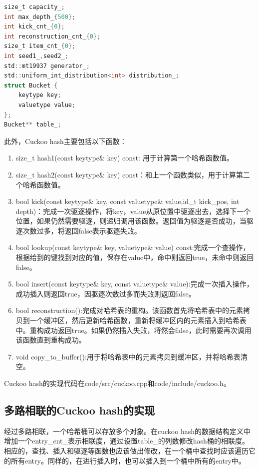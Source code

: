 \documentclass[supercite]{Experimental_Report}
\theoremstyle{definition}
\begin{document}
\begin{lstlisting}[float=h,language=C,caption={Cuckoo hash的数据结构的定义},label={lst:data_structure}]
size_t capacity_;
int max_depth_{500};
int kick_cnt_{0};
int reconstruction_cnt_{0};
size_t item_cnt_{0};
int seed1_,seed2_;
std::mt19937 generator_;
std::uniform_int_distribution<int> distribution_;
struct Bucket {
    keytype key;
    valuetype value;
};
Bucket** table_;
\end{lstlisting}

此外，Cuckoo hash主要包括以下函数：
\begin{enumerate}
\item size\_t hash1(const keytype\& key) const: 用于计算第一个哈希函数值。
\item size\_t hash2(const keytype\& key) const：和上一个函数类似，用于计算第二个哈希函数值。
\item bool kick(const keytype\& key, const valuetype\& value,id\_t kick\_pos, int depth)：完成一次驱逐操作，将{key，value}从原位置中驱逐出去，选择下一个位置，如果仍然需要驱逐，则递归调用该函数。返回值为驱逐是否成功，当驱逐次数过多，将返回false表示驱逐失败。
\item bool lookup(const keytype\& key, valuetype\& value) const:完成一个查操作，根据给到的键找到对应的值，保存在value中，命中则返回true，未命中则返回false。
\item bool insert(const keytype\& key, const valuetype\& value):完成一次插入操作，成功插入则返回true，因驱逐次数过多而失败则返回false。
\item bool reconstruction():完成对哈希表的重构。该函数首先将哈希表中的元素拷贝到一个缓冲区，然后更新哈希函数，重新将缓冲区内的元素插入到哈希表中。重构成功返回true。如果仍然插入失败，将然会false，此时需要再次调用该函数直到重构成功。
\item void copy\_to\_buffer():用于将哈希表中的元素拷贝到缓冲区，并将哈希表清空。
\end{enumerate}

Cuckoo hash的实现代码在code/src/cuckoo.cpp和code/include/cuckoo.h。

\subsection{多路相联的Cuckoo hash的实现}

经过多路相联，一个哈希桶可以存放多个对象。在cuckoo hash的数据结构定义中增加一个entry\_cnt\_表示相联度，通过设置table\_的列数修改hash桶的相联度。相应的，查找、插入和驱逐等函数也应该做出修改，在一个桶中查找时应该遍历它的所有entry。同样的，在进行插入时，也可以插入到一个桶中所有的entry中。
\end{document}
